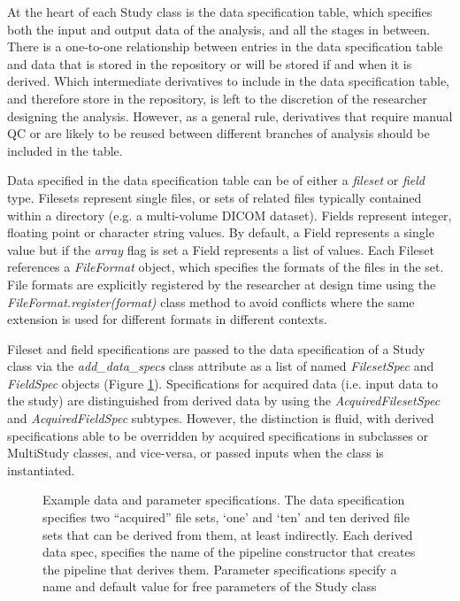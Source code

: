 \documentclass[smallextended]{svjour3}       %
\begin{document}
At the heart of each Study class is the data specification table, which
specifies both the input and output data of the analysis, and all the
stages in between. There is a one-to-one relationship between entries in
the data specification table and data that is stored in the repository
or will be stored if and when it is derived. Which intermediate
derivatives to include in the data specification table, and therefore
store in the repository, is left to the discretion of the researcher
designing the analysis. However, as a general rule, derivatives that
require manual QC or are likely to be reused between different branches
of analysis should be included in the table.

Data specified in the data specification table can be of either a
\emph{fileset} or \emph{field} type. Filesets represent single files,
or sets of related files typically contained within a directory
(e.g. a multi-volume DICOM dataset). Fields
represent integer, floating point or character string
values. By default, a Field represents a single value but if the \emph{array}
flag is set a Field represents a list of values.
Each Fileset references a \emph{FileFormat} object, which
specifies the formats of the files in the set. File formats are
explicitly registered by the researcher at design time using the
\emph{FileFormat.register(format)} class method to avoid conflicts where
the same extension is used for different formats in different contexts.

Fileset and field specifications are passed to the data specification of
a Study class via the \emph{add\_data\_specs} class attribute as a list
of named \emph{FilesetSpec} and \emph{FieldSpec} objects (Figure \ref{fig:data_spec}).
Specifications for acquired data (i.e. input data to the study) are
distinguished from derived data by using the \emph{AcquiredFilesetSpec}
and \emph{AcquiredFieldSpec} subtypes. However, the distinction is
fluid, with derived specifications able to be overridden by acquired
specifications in subclasses or MultiStudy classes, and vice-versa, or
passed inputs when the class is instantiated.

\begin{figure}

\caption{Example data and parameter specifications. The data
specification specifies two ``acquired'' file sets, `one' and `ten' and
ten derived file sets that can be derived from them, at least
indirectly. Each derived data spec, specifies the name of the pipeline
constructor that creates the pipeline that derives them. Parameter
specifications specify a name and default value for free parameters of
the Study class}
\label{fig:data_spec}
\end{figure}
\end{document}

